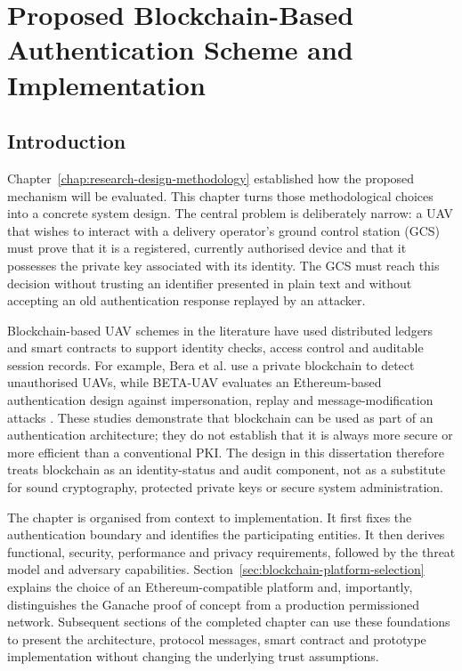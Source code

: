 
\chapter{Proposed Blockchain-Based Authentication Scheme and Implementation}
\label{chap:proposed-scheme}

\section{Introduction}
\label{sec:ch4-introduction}

Chapter~\ref{chap:research-design-methodology} established how the proposed mechanism will be evaluated. This chapter turns those methodological choices into a concrete system design. The central problem is deliberately narrow: a UAV that wishes to interact with a delivery operator's ground control station (GCS) must prove that it is a registered, currently authorised device and that it possesses the private key associated with its identity. The GCS must reach this decision without trusting an identifier presented in plain text and without accepting an old authentication response replayed by an attacker.

Blockchain-based UAV schemes in the literature have used distributed ledgers and smart contracts to support identity checks, access control and auditable session records. For example, Bera et al. use a private blockchain to detect unauthorised UAVs, while BETA-UAV evaluates an Ethereum-based authentication design against impersonation, replay and message-modification attacks \cite{Bera2021PrivateBlockchain,Hafeez2024BETAUAV}. These studies demonstrate that blockchain can be used as part of an authentication architecture; they do not establish that it is always more secure or more efficient than a conventional PKI. The design in this dissertation therefore treats blockchain as an identity-status and audit component, not as a substitute for sound cryptography, protected private keys or secure system administration.

The chapter is organised from context to implementation. It first fixes the authentication boundary and identifies the participating entities. It then derives functional, security, performance and privacy requirements, followed by the threat model and adversary capabilities. Section~\ref{sec:blockchain-platform-selection} explains the choice of an Ethereum-compatible platform and, importantly, distinguishes the Ganache proof of concept from a production permissioned network. Subsequent sections of the completed chapter can use these foundations to present the architecture, protocol messages, smart contract and prototype implementation without changing the underlying trust assumptions.

